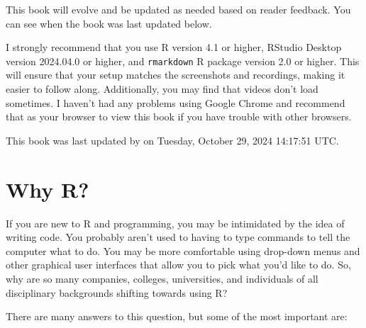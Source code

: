 \documentclass[]{tufte-book}
\begin{document}
This book will evolve and be updated as needed based on reader feedback. You can see when the book was last updated below.

I strongly recommend that you use R version 4.1 or higher, RStudio Desktop version 2024.04.0 or higher, and \texttt{rmarkdown} R package version 2.0 or higher. This will ensure that your setup matches the screenshots and recordings, making it easier to follow along. Additionally, you may find that videos don't load sometimes. I haven't had any problems using Google Chrome and recommend that as your browser to view this book if you have trouble with other browsers.

This book was last updated by on Tuesday, October 29, 2024 14:17:51 UTC.

\chapter{Why R?}\label{whyR}

If you are new to R and programming, you may be intimidated by the idea of writing code. You probably aren't used to having to type commands to tell the computer what to do. You may be more comfortable using drop-down menus and other graphical user interfaces that allow you to pick what you'd like to do. So, why are so many companies, colleges, universities, and individuals of all disciplinary backgrounds shifting towards using R?

There are many answers to this question, but some of the most important are:
\end{document}
